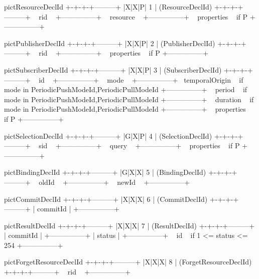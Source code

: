 \begin{SaveVerbatim}{pictResourceDeclId}
+-+-+-+---------+
|X|X|P|    1    | (ResourceDeclId)
+-+-+-+---------+
~      rid      ~
+---------------+
~   resource    ~
+---------------+
~  properties   ~ if P
+---------------+
\end{SaveVerbatim}
\begin{SaveVerbatim}{pictPublisherDeclId}
+-+-+-+---------+
|X|X|P|    2    | (PublisherDeclId)
+-+-+-+---------+
~      rid      ~
+---------------+
~  properties   ~ if P
+---------------+
\end{SaveVerbatim}
\begin{SaveVerbatim}{pictSubscriberDeclId}
+-+-+-+---------+
|X|X|P|    3    | (SubscriberDeclId)
+-+-+-+---------+
~      id       ~
+---------------+
~     mode      ~
+---------------+
~temporalOrigin ~ if mode in {PeriodicPushModeId,PeriodicPullModeId}
+---------------+
~    period     ~ if mode in {PeriodicPushModeId,PeriodicPullModeId}
+---------------+
~   duration    ~ if mode in {PeriodicPushModeId,PeriodicPullModeId}
+---------------+
~  properties   ~ if P
+---------------+
\end{SaveVerbatim}
\begin{SaveVerbatim}{pictSelectionDeclId}
+-+-+-+---------+
|G|X|P|    4    | (SelectionDeclId)
+-+-+-+---------+
~      sid      ~
+---------------+
~     query     ~
+---------------+
~  properties   ~ if P
+---------------+
\end{SaveVerbatim}
\begin{SaveVerbatim}{pictBindingDeclId}
+-+-+-+---------+
|G|X|X|    5    | (BindingDeclId)
+-+-+-+---------+
~     oldId     ~
+---------------+
~     newId     ~
+---------------+
\end{SaveVerbatim}
\begin{SaveVerbatim}{pictCommitDeclId}
+-+-+-+---------+
|X|X|X|    6    | (CommitDeclId)
+-+-+-+---------+
|   commitId    |
+---------------+
\end{SaveVerbatim}
\begin{SaveVerbatim}{pictResultDeclId}
+-+-+-+---------+
|X|X|X|    7    | (ResultDeclId)
+-+-+-+---------+
|   commitId    |
+---------------+
|    status     |
+---------------+
~      id       ~ if 1 <= status <= 254
+---------------+
\end{SaveVerbatim}
\begin{SaveVerbatim}{pictForgetResourceDeclId}
+-+-+-+---------+
|X|X|X|    8    | (ForgetResourceDeclId)
+-+-+-+---------+
~      rid      ~
+---------------+
\end{SaveVerbatim}
